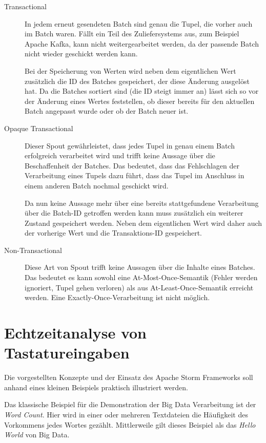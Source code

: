 \documentclass[a4paper,11pt]{scrartcl}
\begin{document}
  \begin{description}
    \item[Transactional] In jedem erneut gesendeten Batch sind genau
      die Tupel, die vorher auch im Batch waren. Fällt ein Teil des
      Zuliefersystems aus, zum Beispiel Apache Kafka, kann nicht
      weitergearbeitet werden, da der passende Batch nicht wieder
      geschickt werden kann.

      Bei der Speicherung von Werten wird neben dem eigentlichen Wert
      zusätzlich die ID des Batches gespeichert, der diese Änderung
      ausgelöst hat. Da die Batches sortiert sind (die ID steigt immer
      an) lässt sich so vor der Änderung eines Wertes feststellen, ob
      dieser bereits für den aktuellen Batch angepasst wurde oder ob
      der Batch neuer ist.
    \item[Opaque Transactional]
      Dieser Spout gewährleistet, dass jedes Tupel in genau einem
      Batch erfolgreich verarbeitet wird und trifft keine Aussage über
      die Beschaffenheit der Batches. Das bedeutet, dass das
      Fehlschlagen der Verarbeitung eines Tupels dazu führt, dass das
      Tupel im Anschluss in einem anderen Batch nochmal geschickt
      wird.

      Da nun keine Aussage mehr über eine bereits stattgefundene
      Verarbeitung über die Batch-ID getroffen werden kann muss
      zusätzlich ein weiterer Zustand gespeichert werden. Neben dem
      eigentlichen Wert wird daher auch der vorherige Wert und die
      Transaktions-ID gespeichert.
    \item[Non-Transactional]
      Diese Art von Spout trifft keine Aussagen über die Inhalte eines
      Batches. Das bedeutet es kann sowohl eine At-Most-Once-Semantik
      (Fehler werden ignoriert, Tupel gehen verloren) als aus
      At-Least-Once-Semantik erreicht werden. Eine
      Exactly-Once-Verarbeitung ist nicht möglich.
  \end{description}

  \section{Echtzeitanalyse von Tastatureingaben}
  Die vorgestellten Konzepte und der Einsatz des Apache Storm
  Frameworks soll anhand eines kleinen Beispiels praktisch illustriert
  werden.

  Das klassische Beispiel für die Demonstration der Big Data
  Verarbeitung ist der \textit{Word Count}. Hier wird in einer oder
  mehreren Textdateien die Häufigkeit des Vorkommens jedes Wortes
  gezählt. Mittlerweile gilt dieses Beispiel als das \textit{Hello
  World} von Big Data.
\end{document}
